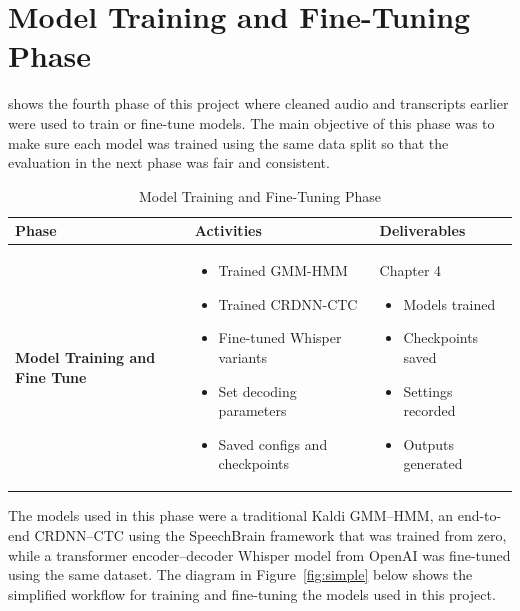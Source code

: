 \section{Model Training and Fine-Tuning Phase}
 shows the fourth phase of this project where cleaned audio and transcripts earlier were used to train or fine-tune models. The main objective of this phase was to make sure each model was trained using the same data split so that the evaluation in the next phase was fair and consistent.
\vspace{1em}

\begin{table}[H]
\centering
\caption{Model Training and Fine-Tuning Phase}
\label{tab:ModelTraining}
{\small
\setlength{\tabcolsep}{6pt}
\renewcommand{\arraystretch}{1.5}

\begin{tabular}{ p{2.8cm}  p{5.3cm}  p{5.3cm}  }
\hline
\textbf{Phase} & \textbf{Activities} & \textbf{Deliverables} \\
\hline 

\textbf{Model Training and Fine Tune} &
\begin{itemize}[leftmargin=*, nosep]
  \item Trained GMM-HMM
  \item Trained CRDNN-CTC 
  \item Fine-tuned Whisper variants
  \item Set decoding parameters
  \item Saved configs and checkpoints
\end{itemize}
&
Chapter 4
\begin{itemize}[leftmargin=*, nosep]
  \item Models trained
  \item Checkpoints saved
  \item Settings recorded
  \item Outputs generated
\end{itemize}
\\ \hline

\end{tabular}}
\end{table}

The models used in this phase were a traditional Kaldi GMM--HMM, an end-to-end CRDNN--CTC using the SpeechBrain framework that was trained from zero, while a transformer encoder--decoder Whisper model from OpenAI was fine-tuned using the same dataset. The diagram in Figure~\ref{fig:simple} below shows the simplified workflow for training and fine-tuning the models used in this project.

